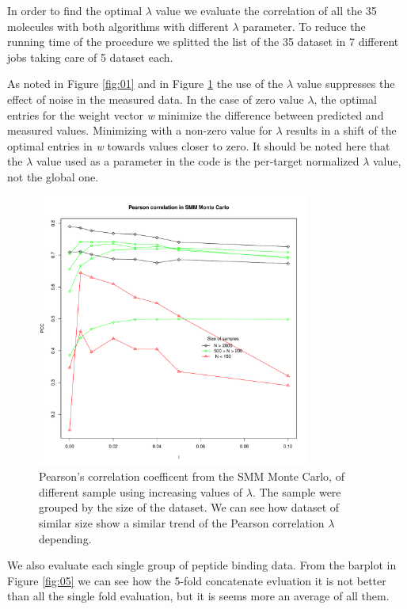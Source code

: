 \documentclass{bioinfo}
\begin{document}
\begin{application}
\par In order to find the optimal $\lambda$ value we evaluate the correlation of all the 35 molecules with both algorithms with different $\lambda$ parameter. To reduce the running time of the procedure we splitted the list of the 35 dataset in 7 different jobs taking care of 5 dataset each. 
\par As noted in Figure \ref{fig:01} and in Figure \ref{fig:02} the use of the $\lambda$ value suppresses the effect of noise in the measured data. In the case of zero value $\lambda$, the optimal entries for the weight vector \textit{w} minimize the difference between predicted and measured values.  Minimizing with a non-zero value for $\lambda$ results in a shift of the optimal entries in \textit{w} towards values closer to zero. It should be noted here that the $\lambda$ value used as a parameter in the code is the per-target normalized $\lambda$ value, not the global one.

\begin{figure}[!tpb]
\centerline{\includegraphics[width=9cm]{fig/smm_mc_l005_ppc_size.pdf}}
\caption{Pearson's correlation coefficent from the SMM Monte Carlo, of different sample using increasing values of $\lambda$. The sample were grouped by the size of the dataset. We can see how dataset of similar size show a similar trend of the Pearson correlation $\lambda$ depending.}
\label{fig:02}
\end{figure}
\par We also evaluate each single group of peptide binding data. From the barplot in Figure \ref{fig:05} we can see how the 5-fold concatenate evluation it is not better than all the single fold evaluation, but it is seems more an average of all them.


\end{application}
\end{document}
